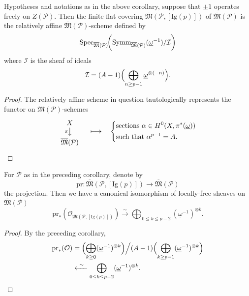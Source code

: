 \begin{kcor}\label{cor:12.8.4}
Hypotheses and notations as in the above corollary, suppose that $\pm 1$ operates freely on $Z(\mathcal{P})$. Then the finite flat covering $\overline{\mathfrak{M}}(\mathcal{P}, [\mathrm{Ig}(p)])$ of $\overline{\mathfrak{M}}(\mathcal{P})$ is the relatively affine $\overline{\mathfrak{M}}(\mathcal{P})$-scheme defined by
\[
\operatorname{Spec}_{\overline{\mathfrak{M}}(\mathcal{P})}\!\biggl( \mathrm{Symm}_{\overline{\mathfrak{M}}(\mathcal{P})}(\underline{\omega}^{-1})/\mathcal{I} \biggr)
\]
where $\mathcal{I}$ is the sheaf of ideals
\[
\mathcal{I} = (A-1)\Bigl( \bigoplus_{n \ge p-1} \underline{\omega}^{\otimes(-n)} \Bigr) .
\]
\end{kcor}

\begin{proof}
The relatively affine scheme in question tautologically represents the functor on $\overline{\mathfrak{M}}(\mathcal{P})$-schemes
\[
\begin{tikzcd}[row sep=1.2em]
X \arrow[d, "\pi"'] \\
\overline{\mathfrak{M}}(\mathcal{P})
\end{tikzcd}
\quad\longmapsto\quad
\left\{
\begin{aligned}
&\text{sections } \alpha \in H^0(X, \pi^*(\underline{\omega})) \\
&\text{such that } \alpha^{p-1} = A .
\end{aligned}
\right. \qedhere
\]
\end{proof}

\begin{kcor}\label{cor:12.8.5}
For $\mathcal{P}$ as in the preceding corollary, denote by
\[
\mathrm{pr} : \overline{\mathfrak{M}}(\mathcal{P}, [\mathrm{Ig}(p)]) \to \overline{\mathfrak{M}}(\mathcal{P})
\]
the projection. Then we have a canonical isomorphism of locally-free sheaves on $\overline{\mathfrak{M}}(\mathcal{P})$
\[
\mathrm{pr}_*(\mathcal{O}_{\overline{\mathfrak{M}}(\mathcal{P}, [\mathrm{Ig}(p)])}) \xrightarrow{\ \sim\ } \bigoplus_{0 \le k \le p-2} (\underline{\omega}^{-1})^{\otimes k} .
\]
\end{kcor}

\begin{proof}
By the preceding corollary,
\begin{align*}
\mathrm{pr}_*(\mathcal{O}) &= \Bigl( \bigoplus_{k \ge 0} (\underline{\omega}^{-1})^{\otimes k} \Bigr) \Big/ (A-1)\Bigl( \bigoplus_{k \ge p-1} (\underline{\omega}^{-1})^{\otimes k} \Bigr) \\
&\xleftarrow{\ \sim\ } \bigoplus_{0 \le k \le p-2} (\underline{\omega}^{-1})^{\otimes k} . \qedhere
\end{align*}
\end{proof}

